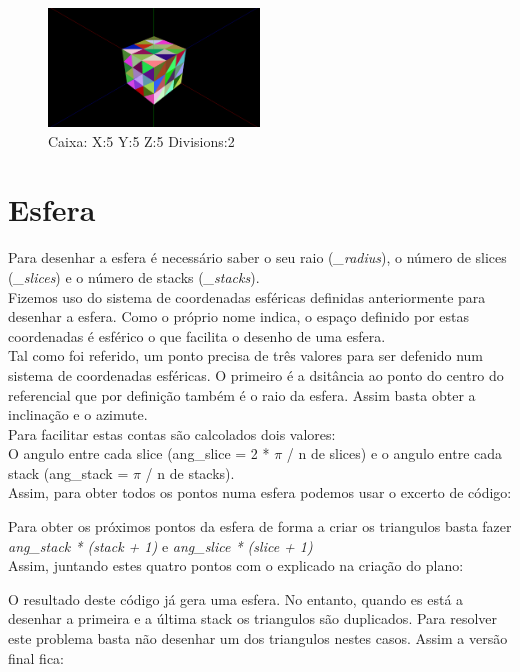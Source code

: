 \documentclass[a4paper]{report}
\begin{document}
\begin{figure}[H]
    \centering 
    \includegraphics[width=0.5\textwidth]{images/box.png}  
    \caption{Caixa: X:5 Y:5 Z:5 Divisions:2}
    \label{fig:box_render}
\end{figure}

\section{Esfera}
Para desenhar a esfera é necessário saber o seu raio (\textit{\_radius}), o
número de slices (\textit{\_slices}) e o número de stacks (\textit{\_stacks}).\\
Fizemos uso do sistema de coordenadas esféricas definidas
anteriormente para desenhar a esfera. Como o próprio nome indica, o espaço
definido por estas coordenadas é esférico o que facilita o desenho de uma
esfera.\\
Tal como foi referido, um ponto precisa de três valores para ser defenido num
sistema de coordenadas esféricas. O primeiro é a dsitância ao ponto do centro do
referencial que por definição também é o raio da esfera. Assim basta obter a
inclinação e o azimute.\\
Para facilitar estas contas são calcolados dois valores:\\
O angulo entre cada slice (ang\_slice = 2 * $\pi$ / n de slices) e o angulo
entre cada stack (ang\_stack = $\pi$ / n de stacks).\\
Assim, para obter todos os pontos numa esfera podemos usar o excerto de código:


Para obter os próximos pontos da esfera de forma a criar os triangulos basta
fazer \textit{ang\_stack * (stack + 1)} e \textit{ang\_slice * (slice + 1)}\\
Assim, juntando estes quatro pontos com o explicado na criação do plano:


O resultado deste código já gera uma esfera. No entanto, quando es está a
desenhar a primeira e a última stack os triangulos são duplicados.
Para resolver este problema basta não desenhar um dos triangulos nestes casos.
Assim a versão final fica:
\end{document}
